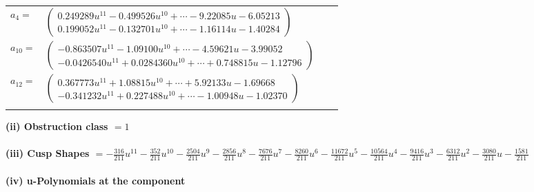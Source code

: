 \documentclass[1p]{elsarticle_modified}
\theoremstyle{definition}
\begin{document}
\begin{tabular}{m{7pt} m{180pt} m{7pt} m{180pt} }
\flushright $a_{4}=$&$\begin{pmatrix}0.249289 u^{11}-0.499526 u^{10}+\cdots-9.22085 u-6.05213\\0.199052 u^{11}-0.132701 u^{10}+\cdots-1.16114 u-1.40284\end{pmatrix}$ \\
\flushright $a_{10}=$&$\begin{pmatrix}-0.863507 u^{11}-1.09100 u^{10}+\cdots-4.59621 u-3.99052\\-0.0426540 u^{11}+0.0284360 u^{10}+\cdots+0.748815 u-1.12796\end{pmatrix}$ \\
\flushright $a_{12}=$&$\begin{pmatrix}0.367773 u^{11}+1.08815 u^{10}+\cdots+5.92133 u-1.69668\\-0.341232 u^{11}+0.227488 u^{10}+\cdots-1.00948 u-1.02370\end{pmatrix}$\\&\end{tabular}
\flushleft \textbf{(ii) Obstruction class $= 1$}\\~\\
\flushleft \textbf{(iii) Cusp Shapes $= -\frac{316}{211} u^{11}-\frac{352}{211} u^{10}-\frac{2504}{211} u^9-\frac{2856}{211} u^8-\frac{7676}{211} u^7-\frac{8260}{211} u^6-\frac{11672}{211} u^5-\frac{10564}{211} u^4-\frac{9416}{211} u^3-\frac{6312}{211} u^2-\frac{3080}{211} u-\frac{1581}{211}$}\\~\\
\newpage\renewcommand{\arraystretch}{1}
\flushleft \textbf{(iv) u-Polynomials at the component}\newline \\
\end{document}
